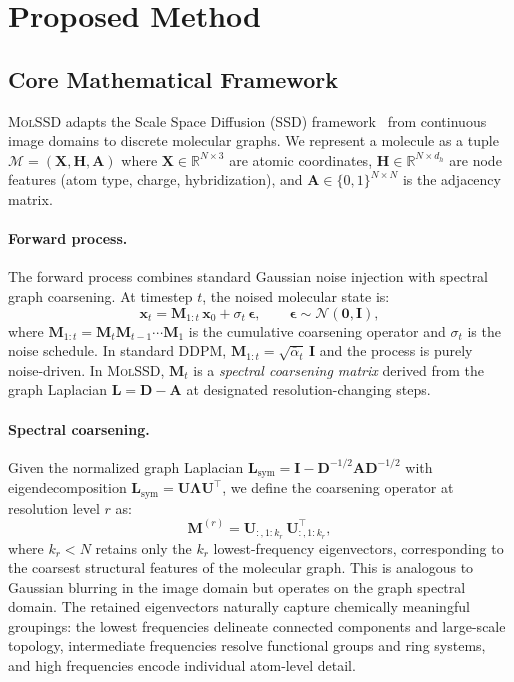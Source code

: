 \documentclass[11pt,a4paper]{article}
\newcommand{\molssd}{\textsc{MolSSD}}
\newcommand{\xt}{\mathbf{x}_t}
\newcommand{\xzero}{\mathbf{x}_0}
\newcommand{\R}{\mathbb{R}}
\begin{document}
\section{Proposed Method}

\subsection{Core Mathematical Framework}

\molssd{} adapts the Scale Space Diffusion (SSD) framework~\citep{ssd2026} from
continuous image domains to discrete molecular graphs. We represent a molecule as a
tuple $\mathcal{M} = (\mathbf{X}, \mathbf{H}, \mathbf{A})$ where
$\mathbf{X} \in \R^{N \times 3}$ are atomic coordinates,
$\mathbf{H} \in \R^{N \times d_h}$ are node features (atom type, charge, hybridization),
and $\mathbf{A} \in \{0,1\}^{N \times N}$ is the adjacency matrix.

\paragraph{Forward process.}
The forward process combines standard Gaussian noise injection with spectral graph
coarsening. At timestep $t$, the noised molecular state is:
\begin{equation}\label{eq:forward}
  \xt = \mathbf{M}_{1:t}\,\xzero + \sigma_t\,\boldsymbol{\epsilon},
  \qquad \boldsymbol{\epsilon} \sim \mathcal{N}(\mathbf{0}, \mathbf{I}),
\end{equation}
where $\mathbf{M}_{1:t} = \mathbf{M}_t \mathbf{M}_{t-1} \cdots \mathbf{M}_1$ is the
cumulative coarsening operator and $\sigma_t$ is the noise schedule. In standard DDPM,
$\mathbf{M}_{1:t} = \sqrt{\bar{\alpha}_t}\,\mathbf{I}$ and the process is purely
noise-driven. In \molssd{}, $\mathbf{M}_t$ is a \emph{spectral coarsening matrix}
derived from the graph Laplacian $\mathbf{L} = \mathbf{D} - \mathbf{A}$ at designated
resolution-changing steps.

\paragraph{Spectral coarsening.}
Given the normalized graph Laplacian $\mathbf{L}_\text{sym} = \mathbf{I} -
\mathbf{D}^{-1/2}\mathbf{A}\mathbf{D}^{-1/2}$ with eigendecomposition
$\mathbf{L}_\text{sym} = \mathbf{U}\boldsymbol{\Lambda}\mathbf{U}^\top$, we define
the coarsening operator at resolution level $r$ as:
\begin{equation}\label{eq:coarsen}
  \mathbf{M}^{(r)} = \mathbf{U}_{:,1:k_r}\,\mathbf{U}_{:,1:k_r}^\top,
\end{equation}
where $k_r < N$ retains only the $k_r$ lowest-frequency eigenvectors, corresponding
to the coarsest structural features of the molecular graph. This is analogous to
Gaussian blurring in the image domain but operates on the graph spectral domain. The
retained eigenvectors naturally capture chemically meaningful groupings: the lowest
frequencies delineate connected components and large-scale topology, intermediate
frequencies resolve functional groups and ring systems, and high frequencies encode
individual atom-level detail.
\end{document}
